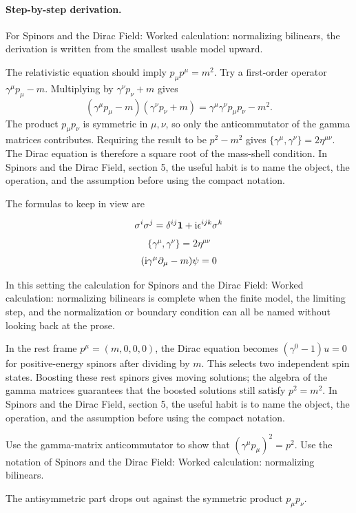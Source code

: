 \paragraph{Step-by-step derivation.}

For Spinors and the Dirac Field: Worked calculation: normalizing bilinears, the derivation is written from the smallest usable model upward.

The relativistic equation should imply \(p_\mu p^\mu=m^2\).  Try a first-order operator \(\gamma^\mu p_\mu-m\).  Multiplying by \(\gamma^\nu p_\nu+m\) gives
\[
  (\gamma^\mu p_\mu-m)(\gamma^\nu p_\nu+m)
  =
  \gamma^\mu\gamma^\nu p_\mu p_\nu-m^2.
\]
The product \(p_\mu p_\nu\) is symmetric in \(\mu,\nu\), so only the anticommutator of the gamma matrices contributes.  Requiring the result to be \(p^2-m^2\) gives \(\{\gamma^\mu,\gamma^\nu\}=2\eta^{\mu\nu}\).  The Dirac equation is therefore a square root of the mass-shell condition.  In Spinors and the Dirac Field, section 5, the useful habit is to name the object, the operation, and the assumption before using the compact notation.

The formulas to keep in view are

\[
  \sigma^i\sigma^j=\delta^{ij}\mathbf 1+\mathrm i\epsilon^{ijk}\sigma^k
\]
\[
  \{\gamma^\mu,\gamma^\nu\}=2\eta^{\mu\nu}
\]
\[
  (\mathrm i\gamma^\mu\partial_\mu-m)\psi=0
\]

In this setting the calculation for Spinors and the Dirac Field: Worked calculation: normalizing bilinears is complete when the finite model, the limiting step, and the normalization or boundary condition can all be named without looking back at the prose.




\begin{example}
In the rest frame \(p^\mu=(m,0,0,0)\), the Dirac equation becomes \((\gamma^0-1)u=0\) for positive-energy spinors after dividing by \(m\).  This selects two independent spin states.  Boosting these rest spinors gives moving solutions; the algebra of the gamma matrices guarantees that the boosted solutions still satisfy \(p^2=m^2\).  In Spinors and the Dirac Field, section 5, the useful habit is to name the object, the operation, and the assumption before using the compact notation.
\end{example}



\begin{exercise}
Use the gamma-matrix anticommutator to show that \((\gamma^\mu p_\mu)^2=p^2\).  Use the notation of Spinors and the Dirac Field: Worked calculation: normalizing bilinears.
\begin{answer}
The antisymmetric part drops out against the symmetric product \(p_\mu p_\nu\).
\end{answer}
\end{exercise}

